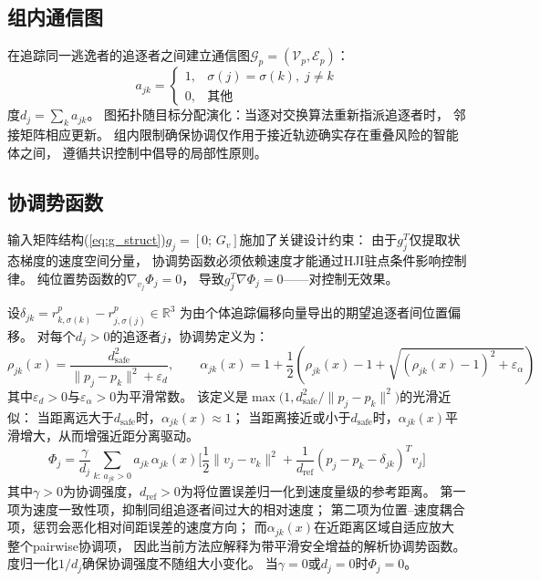 \documentclass[conference]{IEEEtran}
\begin{document}
\subsection{组内通信图}

在追踪同一逃逸者的追逐者之间建立通信图$\mathcal{G}_p = (\mathcal{V}_p, \mathcal{E}_p)$：
\begin{equation}\label{eq:adj}
a_{jk} = \begin{cases} 1, & \sigma(j) = \sigma(k),\; j \neq k \\ 0, & \text{其他} \end{cases}
\end{equation}
度$d_j = \sum_k a_{jk}$。
图拓扑随目标分配演化：当逐对交换算法重新指派追逐者时，
邻接矩阵相应更新。
组内限制确保协调仅作用于接近轨迹确实存在重叠风险的智能体之间，
遵循共识控制中倡导的局部性原则\cite{b_ren2005,b_olfati2004}。

\subsection{协调势函数}

输入矩阵结构(\ref{eq:g_struct})$g_j = [0;\, G_v]$施加了关键设计约束：
由于$g_j^T$仅提取状态梯度的速度空间分量，
协调势函数必须依赖速度才能通过HJI驻点条件影响控制律。
纯位置势函数的$\nabla_{v_j}\Phi_j = 0$，
导致$g_j^T\nabla\Phi_j = 0$——对控制无效果。

设$\delta_{jk} = r_{k,\sigma(k)}^p - r_{j,\sigma(j)}^p \in \mathbb{R}^3$
为由个体追踪偏移向量导出的期望追逐者间位置偏移。
对每个$d_j > 0$的追逐者$j$，协调势定义为：
\begin{equation}
\rho_{jk}(x)=\frac{d_{\mathrm{safe}}^2}{\|p_j-p_k\|^2+\varepsilon_d},
\qquad
\alpha_{jk}(x)=1+\frac{1}{2}\left(\rho_{jk}(x)-1+\sqrt{(\rho_{jk}(x)-1)^2+\varepsilon_\alpha}\right)
\end{equation}
其中$\varepsilon_d>0$与$\varepsilon_\alpha>0$为平滑常数。
该定义是$\max\!\big(1, d_{\mathrm{safe}}^2/\|p_j-p_k\|^2\big)$的光滑近似：
当距离远大于$d_{\mathrm{safe}}$时，$\alpha_{jk}(x)\approx 1$；
当距离接近或小于$d_{\mathrm{safe}}$时，$\alpha_{jk}(x)$平滑增大，从而增强近距分离驱动。
\begin{equation}\label{eq:phi}
\Phi_j = \frac{\gamma}{d_j}\!\sum_{k:\,a_{jk}>0}\! a_{jk}\,\alpha_{jk}(x)
\bigg[\frac{1}{2}\|v_j{-}v_k\|^2 + \frac{1}{d_{\mathrm{ref}}}(p_j{-}p_k{-}\delta_{jk})^T v_j\bigg]
\end{equation}
其中$\gamma > 0$为协调强度，$d_{\mathrm{ref}} > 0$为将位置误差归一化到速度量级的参考距离。
第一项为速度一致性项，抑制同组追逐者间过大的相对速度；
第二项为位置--速度耦合项，惩罚会恶化相对间距误差的速度方向；
而$\alpha_{jk}(x)$在近距离区域自适应放大整个pairwise协调项，
因此当前方法应解释为带平滑安全增益的解析协调势函数。
度归一化$1/d_j$确保协调强度不随组大小变化。
当$\gamma = 0$或$d_j = 0$时$\Phi_j = 0$。
\end{document}
